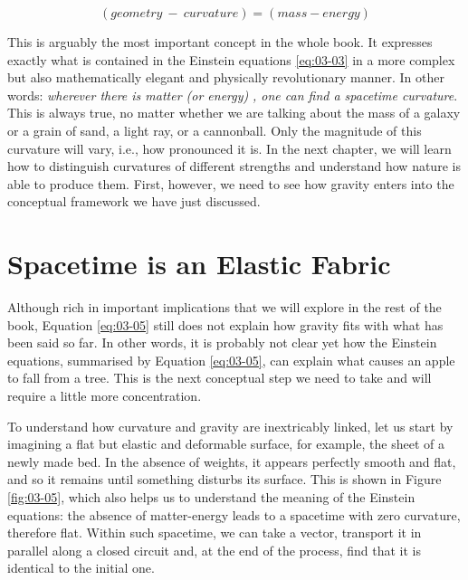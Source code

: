 \begin{equation}\label{eq:03-05}
(geometry\  - \ curvature) = (mass - energy)
\end{equation}


This is arguably the most important concept in the whole book. It expresses exactly what
is contained in the Einstein equations \eqref{eq:03-03} in a more complex but also mathematically
elegant and physically revolutionary manner. In other words: \emph{wherever there is
matter (or energy)} \emph{, one can find a
spacetime curvature}. This is always true, no matter whether we are talking about the
mass of a galaxy or a grain of sand, a light ray, or a cannonball. Only the magnitude of
this curvature will vary, i.e., how pronounced it is. In the next chapter, we will learn
how to distinguish curvatures of different strengths and understand how nature is able
to produce them. First, however, we need to see how gravity enters into the conceptual
framework we have just discussed.

\section{Spacetime is an Elastic Fabric}\label{sec:03-fabric}

Although rich in important implications that we will explore in the rest of the book,
Equation \eqref{eq:03-05} still does not explain how gravity fits with what has been said so far.
In other words, it is probably not clear yet how the Einstein equations, summarised by
Equation \eqref{eq:03-05}, can explain what causes an apple to fall from a tree. This is the next
conceptual step we need to take and will require a little more concentration.

To understand how curvature and gravity are inextricably linked, let us start by
imagining a flat but elastic and deformable surface, for example, the sheet of a newly
made bed. In the absence of weights, it appears perfectly smooth and flat, and so it
remains until something disturbs its surface. This is shown in Figure \ref{fig:03-05}, which also
helps us to understand the meaning of the Einstein equations: the absence of
matter-energy leads to a spacetime with zero curvature, therefore flat. Within such
spacetime, we can take a vector, transport it in parallel along a
closed circuit and, at the end of the process, find that it is identical to the initial
one.

